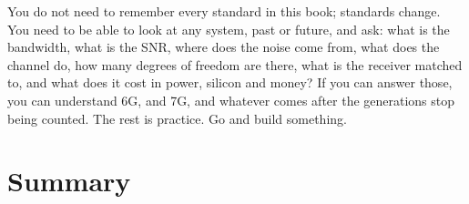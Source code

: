 \begin{keyidea}
You do not need to remember every standard in this book; standards change. You need to be able to
look at any system, past or future, and ask: what is the bandwidth, what is the SNR, where does the
noise come from, what does the channel do, how many degrees of freedom are there, what is the receiver
matched to, and what does it cost in power, silicon and money? If you can answer those, you can
understand 6G, and 7G, and whatever comes after the generations stop being counted. The rest is
practice. Go and build something.
\end{keyidea}


\section{Summary}
\label{sec:ch25:summary}

